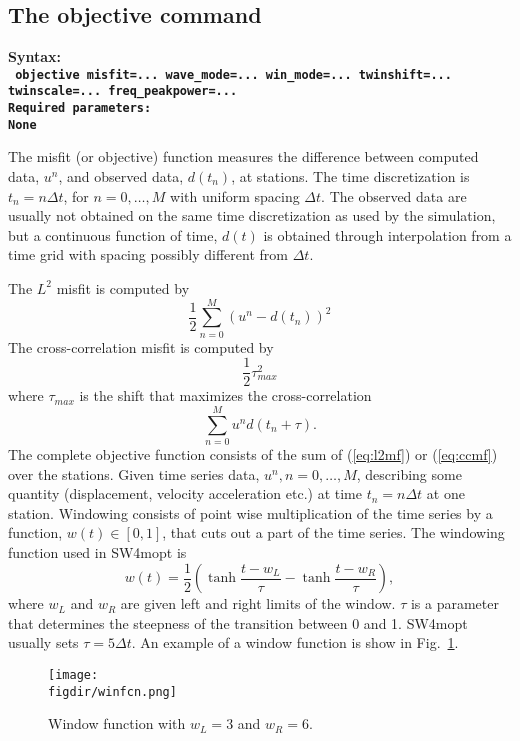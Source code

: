 \documentclass[12pt]{report}
\def\figdir{mfigs}
\begin{document}
\subsection{The objective command}\label{sec:objective}
\begin{flushleft}\bf
Syntax:\\
\tt
objective misfit=... wave\_mode=... win\_mode=... twinshift=... twinscale=... freq\_peakpower=...
\\
\bf Required parameters:\\
\rm
None
\end{flushleft}
The misfit (or objective) function measures the difference between computed data, $u^n$, and observed
data, $d(t_n)$, at stations. The time discretization is $t_n=n\Delta t$, for $n=0,\ldots,M$ 
with uniform spacing $\Delta t$. The observed data are usually not obtained on the same time 
discretization as used by the simulation, but a continuous function of time, $d(t)$ is obtained
through interpolation from a time grid with spacing possibly different from $\Delta t$.
\par
The $L^2$ misfit is computed by
\begin{equation}
 \frac{1}{2}\sum_{n=0}^M (u^n-d(t_n))^2
\label{eq:l2mf}
\end{equation}
The cross-correlation misfit is computed by
\begin{equation}
  \frac{1}{2}\tau^2_{max}
\label{eq:ccmf}
\end{equation}
where $\tau_{max}$ is the shift that maximizes the cross-correlation
$$
  \sum_{n=0}^M u^n d(t_n+\tau).
$$
The complete objective function consists of the sum of (\ref{eq:l2mf}) or (\ref{eq:ccmf})
over the stations.
Given time series data, $u^n, n=0,\ldots,M$, describing some quantity (displacement, 
velocity acceleration etc.) at time $t_n=n\Delta t$ at one station. Windowing consists 
of point wise multiplication of the time series by a function, $w(t)\in [0,1]$, that 
cuts out a part of the time series. The windowing function used in SW4mopt is 
$$
   w(t) =  \frac{1}{2}(\tanh \frac{t-w_L}{\tau} - \tanh \frac{t-w_R}{\tau}),
$$
where $w_L$ and $w_R$ are given left and right limits of the window. $\tau$ is a parameter 
that determines the steepness of the transition between 0 and 1. SW4mopt usually 
sets $\tau=5\Delta t$. An example of a window function is show in Fig.~\ref{fig:winfcn}.
\begin{figure}
\begin{center}
\texttt{[image: \\figdir/winfcn.png]}
\end{center}
\caption{Window function with $w_L=3$ and $w_R=6$.}
\label{fig:winfcn}
\end{figure}
\end{document}
